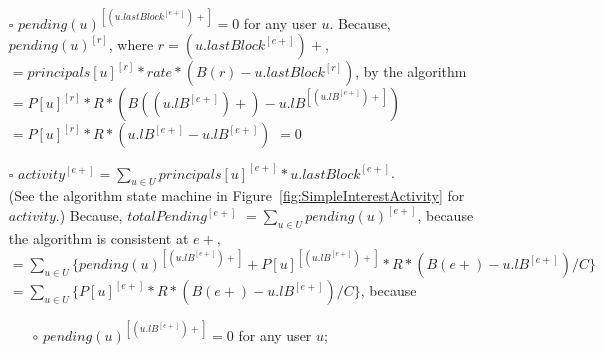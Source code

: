 \documentclass{article}
\begin{document}
\begin{itemize}
\begin{itemize}
    \item[$\square$] $pending(u)^{[(u.lastBlock^{[e+]})+]} = 0$ for any user $u$.
    \newline \newline
    Because, $pending(u)^{[r]}$, where $r = (u.lastBlock^{[e+]})+$,
    \newline \newline 
    $ = principals[u]^{[r]} * rate * (B(r) - u.lastBlock^{[r]}) $, by the algorithm
    \newline \newline 
    $ = P[u]^{[r]} * R * (B((u.lB^{[e+]})+) - u.lB^{[(u.lB^{[e+]})+]}) $
    \newline \newline 
    $ = P[u]^{[r]} * R * (u.lB^{[e+]} - u.lB^{[e+]}) $
    \newline \newline 
    $ = 0 $
    \newline

    \item[$\square$] $ activity^{[e+]} = \sum_{u \in U} principals[u]^{[e+]} * u.lastBlock^{[e+]}$.\\
    (See the algorithm state machine in Figure~\ref{fig:SimpleInterestActivity} for $activity$.)
    \newline \newline
    Because, {$ totalPending^{[e+]} $}
    \newline \newline
    $ = \sum_{u \in U} pending(u)^{[e+]} $, because the algorithm is consistent at $e+$,
    \newline \newline
    $ = \sum_{u \in U} \{ pending(u)^{[(u.lB^{[e+]})+]}
    + P[u]^{[(u.lB^{[e+]})+]} * R * (B(e+) - u.lB^{[e+]}) / C \}$
    \newline \newline
    $ = \sum_{u \in U} \{ P[u]^{[e+]} * R * (B(e+) - u.lB^{[e+]}) / C \}$,
    \newline \newline
   because
   \begin{itemize}
      \item[$\circ$] $pending(u)^{[(u.lB^{[e+]})+]} = 0$ for any user $u$; \newline


\end{itemize}
\end{itemize}
\end{itemize}
\end{document}
